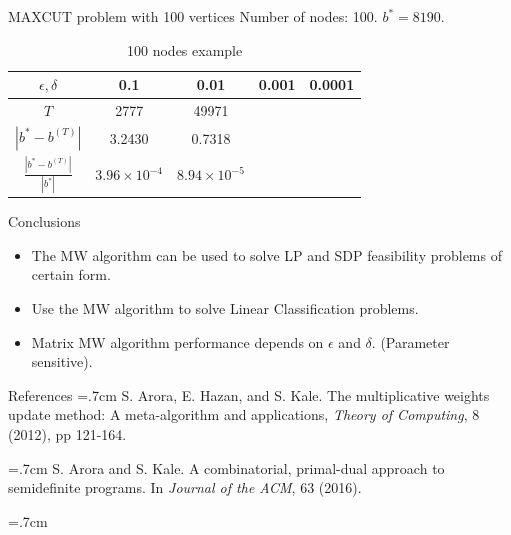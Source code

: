 \documentclass{beamer}
\begin{document}
\begin{frame}{MAXCUT problem with 100 vertices}
Number of nodes: 100. $b^* = 8190$. 
\begin{table}[htbp]\label{100nodestable}
\centering
\begin{tabular}{||c|c|c|c|c||}
\hline
$\epsilon, \delta$ & 0.1 & 0.01 & 0.001 & 0.0001 \\
\hline
$T$ & 2777 & 49971 &  & \\
\hline
$|b^* - b^{(T)}|$ & 3.2430 & 0.7318 &  & \\
\hline
$\frac{|b^* - b^{(T)}|}{|b^*|}$ & $3.96\times 10^{-4}$  & $8.94\times 10^{-5}$ & & \\
\hline
\end{tabular}
\caption{100 nodes example}
\end{table}

\end{frame}

\begin{frame}{Conclusions}
\begin{itemize}
\item The MW algorithm can be used to solve LP and SDP feasibility problems of certain form.
\item 
Use the MW algorithm to solve Linear Classification problems.
\item
Matrix MW algorithm performance depends on $\epsilon$ and $\delta$. (Parameter sensitive).
\end{itemize}
\end{frame}

\begin{frame}{References}
\noindent
\hangindent=.7cm 
S. Arora, E. Hazan, and S. Kale. The multiplicative weights update method: A meta-algorithm and applications, \emph{Theory of Computing}, 8 (2012), pp 121-164.

\vspace{.5cm}
\noindent
\hangindent=.7cm 
S. Arora and S. Kale. A combinatorial, primal-dual approach to semidefinite programs. In \emph{Journal of the ACM}, 63 (2016).

\vspace{.5cm}
\noindent
\hangindent=.7cm 

\end{frame}
\end{document}
